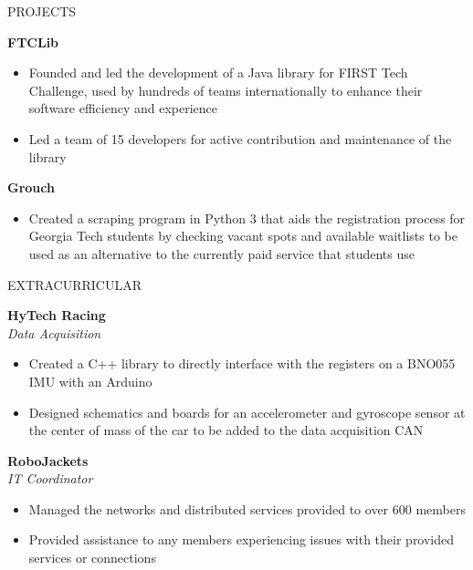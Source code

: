 \documentclass{resume} %
\begin{document}
\vspace{-0.8em}
\begin{rSection}{PROJECTS}
\vspace{-1.25em}
\item \textbf{FTCLib}
\vspace{-0.5em}
 \begin{itemize}
    \itemsep -5pt {} 
     \item Founded and led the development of a Java library for FIRST Tech Challenge, used by hundreds of teams internationally
     to enhance their software efficiency and experience
     \item Led a team of 15 developers for active contribution and maintenance of the library
 \end{itemize}
\vspace{-0.5em}
\item \textbf{Grouch}
\vspace{-0.5em}
 \begin{itemize}
    \itemsep -5pt {}
    \item Created a scraping program in Python 3 that aids the registration process for Georgia Tech students by
    checking vacant spots and available waitlists to be used as an alternative to the currently paid service
    that students use
 \end{itemize}
\end{rSection}

\vspace{-0.8em}
\begin{rSection}{EXTRACURRICULAR}
\vspace{-1.25em}
\item \textbf{HyTech Racing}\\
\textit{Data Acquisition}
\vspace{-0.5em}
 \begin{itemize}
    \itemsep -5pt {} 
    \item Created a C++ library to directly interface with the registers on a BNO055 IMU with an Arduino
    \item Designed schematics and boards for an accelerometer and gyroscope sensor at the center of mass
    of the car to be added to the data acquisition CAN
 \end{itemize}
\vspace{-0.5em}
\item \textbf{RoboJackets}\\
\textit{IT Coordinator}
\vspace{-0.5em}
 \begin{itemize}
    \itemsep -5pt {} 
    \item Managed the networks and distributed services provided to over 600 members
    \item Provided assistance to any members experiencing issues with their provided services or connections
 \end{itemize}
\end{rSection}
\end{document}
